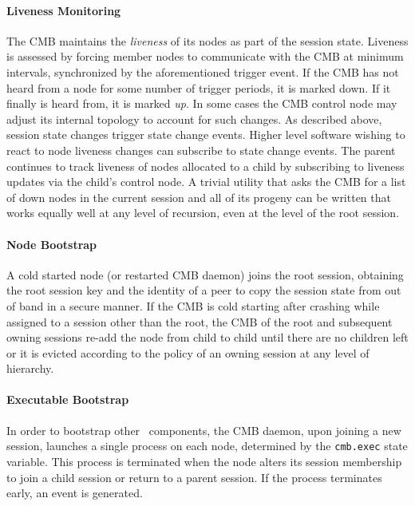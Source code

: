 \paragraph{Liveness Monitoring}
The CMB maintains the {\em liveness} of its nodes as part
of the session state.
Liveness is assessed by forcing member nodes to communicate with the CMB
at minimum intervals, synchronized by the aforementioned trigger event.
If the CMB has not heard from a node for some number
of trigger periods, it is marked down.
If it finally is heard from, it is marked {\em up}.
In some cases the CMB control node may adjust its internal topology
to account for such changes.
As described above, session state changes trigger state change events.
Higher level software wishing to react to node liveness changes can
subscribe to state change events.
The parent continues to track liveness of nodes allocated to a child by
subscribing to liveness updates via the child's control node.  A trivial
utility that asks the CMB for a list of down nodes in the current session
and all of its progeny can be written that works equally well at any level of recursion,
even at the level of the root session.

\paragraph{Node Bootstrap}
A cold started node (or restarted CMB daemon) joins the root session,
obtaining the root session key and the identity of a peer to copy the
session state from out of band in a secure manner.
If the CMB is cold starting after crashing while assigned to
a session other than the root, the CMB of the root and subsequent owning
sessions re-add the node from child to child until there are no children
left or it is evicted according to the policy of an owning session
at any level of hierarchy.

\paragraph{Executable Bootstrap}
In order to bootstrap other \ngrm\ components, the CMB daemon, upon
joining a new session, launches a single process on each node,
determined by the {\tt cmb.exec} state variable.
This process is terminated when the node alters its session membership
to join a child session or return to a parent session.
If the process terminates early, an event is generated.


